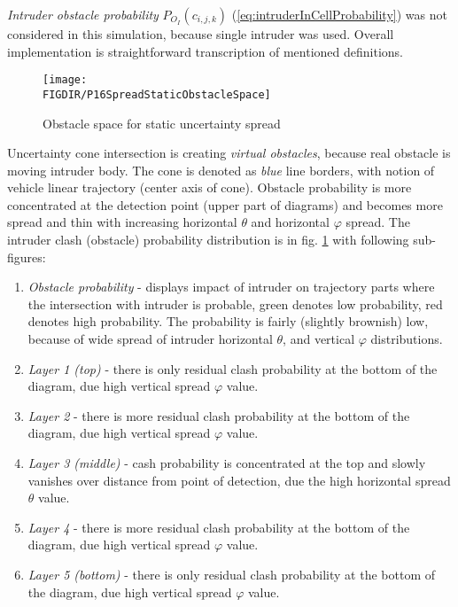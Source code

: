 \emph{Intruder obstacle probability} $P_{O_I}(c_{i,j,k})$ (\ref{eq:intruderInCellProbability}) was not considered in this simulation, because single intruder was used.  Overall implementation is straightforward transcription of mentioned definitions. 
\begin{figure}[H]
    \centering
    \texttt{[image: \\FIGDIR/P16SpreadStaticObstacleSpace]}
    \caption{Obstacle space for static uncertainty spread}
    \label{fig:P16SpreadStaticObstacleSpace}
\end{figure}

\noindent Uncertainty cone intersection is creating \emph{virtual obstacles}, because real obstacle is moving intruder body. The cone is denoted as \emph{blue} line borders, with notion of vehicle linear trajectory (center axis of cone). Obstacle probability is more concentrated at the detection point (upper part of diagrams) and becomes more spread and thin with increasing horizontal $\theta$ and horizontal $\varphi$ spread. The intruder clash (obstacle) probability distribution is in fig. \ref{fig:P16SpreadStaticObstacleSpace} with following sub-figures:
\begin{enumerate}
    \item\emph{Obstacle probability} - displays impact of intruder on trajectory parts where the intersection with intruder is probable, green denotes low probability, red denotes high probability. The probability is fairly (slightly brownish) low, because of wide spread of intruder horizontal $\theta$, and vertical $\varphi$ distributions.
    \item\emph{Layer 1 (top)} - there is only residual clash probability at the bottom of the diagram, due high vertical spread $\varphi$ value.
    \item\emph{Layer 2} - there is more residual clash probability at the bottom of the diagram, due high vertical spread $\varphi$ value.
    \item\emph{Layer 3 (middle)} - cash probability is concentrated at the top and slowly vanishes over distance from point of detection, due the high horizontal spread $\theta$ value.
    \item\emph{Layer 4} - there is more residual clash probability at the bottom of the diagram, due high vertical spread $\varphi$ value.
    \item\emph{Layer 5 (bottom)} - there is only residual clash probability at the bottom of the diagram, due high vertical spread $\varphi$ value.
\end{enumerate}


